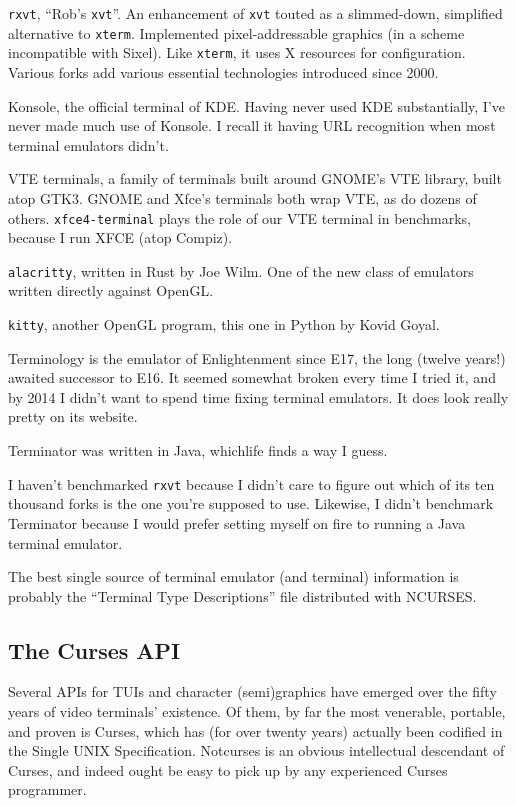\begin{denseitemize}
\item{\texttt{rxvt}, ``Rob's \texttt{xvt}''. An enhancement of \texttt{xvt} touted
    as a slimmed-down, simplified alternative to \texttt{xterm}. Implemented pixel-addressable
    graphics (in a scheme incompatible with Sixel). Like \texttt{xterm}, it uses
    X resources for configuration. Various forks add various essential technologies
    introduced since 2000.}
\item{Konsole, the official terminal of KDE. Having never used KDE substantially,
   I've never made much use of Konsole. I recall it having URL recognition
   when most terminal emulators didn't.}
\item{VTE terminals, a family of terminals built around GNOME's VTE library, built
  atop GTK3. GNOME and Xfce's terminals both wrap VTE, as do dozens of others.
  \texttt{xfce4-terminal} plays the role of our VTE terminal in benchmarks, because
  I run XFCE (atop Compiz).}
\item{\texttt{alacritty}, written in Rust by Joe Wilm. One of the new class of
    emulators written directly against OpenGL.}
\item{\texttt{kitty}, another OpenGL program, this one in Python by Kovid Goyal.}
\item{Terminology is the emulator of Enlightenment since E17, the long (twelve
    years!) awaited successor to E16. It seemed somewhat broken every time I
    tried it, and by 2014 I didn't want to spend time fixing terminal emulators.
    It does look really pretty on its website\cite{terminology}.}
\item{Terminator was written in Java, which\textellipsis life finds a way I guess.}
\end{denseitemize}

I haven't benchmarked \texttt{rxvt} because I didn't care to figure out which of
its ten thousand forks is the one you're supposed to use. Likewise, I didn't
benchmark Terminator because I would prefer setting myself on fire
to running a Java terminal emulator.

The best single source of terminal emulator (and terminal) information is
probably the ``Terminal Type Descriptions'' file distributed with NCURSES\cite{termdescript}.

\subsection{The Curses API}
Several APIs for TUIs and character (semi)graphics have emerged over the fifty
years of video terminals' existence. Of them, by far the most venerable,
portable, and proven is Curses, which has (for over twenty years) actually
been codified in the Single UNIX Specification. Notcurses is an obvious
intellectual descendant of Curses, and indeed ought be easy to pick up by any
experienced Curses programmer.

